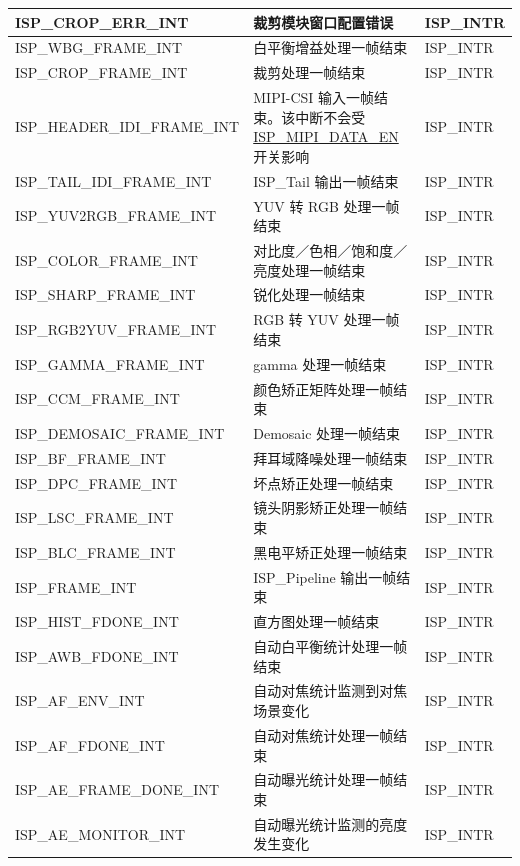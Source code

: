 \documentclass[main\_\_CN.tex]{subfiles}
\begin{document}
\begin{longtable}{ | L{5.6cm} | L{5.8cm} | L{3cm} | }
    ISP\_CROP\_ERR\_INT & 裁剪模块窗口配置错误 & ISP\_INTR \\ \hline
    ISP\_WBG\_FRAME\_INT & 白平衡增益处理一帧结束 & ISP\_INTR \\ \hline
    ISP\_CROP\_FRAME\_INT & 裁剪处理一帧结束 & ISP\_INTR \\ \hline
    ISP\_HEADER\_IDI\_FRAME\_INT & MIPI-CSI 输入一帧结束。该中断不会受 \hyperref[fielddesc:ISPMIPIDATAEN]{ISP\_MIPI\_DATA\_EN} 开关影响 & ISP\_INTR \\ \hline
    ISP\_TAIL\_IDI\_FRAME\_INT & ISP\_Tail 输出一帧结束 & ISP\_INTR \\ \hline
    ISP\_YUV2RGB\_FRAME\_INT & YUV 转 RGB 处理一帧结束 & ISP\_INTR \\ \hline
    ISP\_COLOR\_FRAME\_INT & 对比度／色相／饱和度／亮度处理一帧结束 & ISP\_INTR \\ \hline
    ISP\_SHARP\_FRAME\_INT & 锐化处理一帧结束 & ISP\_INTR \\ \hline
    ISP\_RGB2YUV\_FRAME\_INT & RGB 转 YUV 处理一帧结束 & ISP\_INTR \\ \hline
    ISP\_GAMMA\_FRAME\_INT & gamma 处理一帧结束 & ISP\_INTR \\ \hline
    ISP\_CCM\_FRAME\_INT & 颜色矫正矩阵处理一帧结束 & ISP\_INTR \\ \hline
    ISP\_DEMOSAIC\_FRAME\_INT & Demosaic 处理一帧结束 & ISP\_INTR \\ \hline
    ISP\_BF\_FRAME\_INT & 拜耳域降噪处理一帧结束 & ISP\_INTR \\ \hline
    ISP\_DPC\_FRAME\_INT & 坏点矫正处理一帧结束 & ISP\_INTR \\ \hline
    ISP\_LSC\_FRAME\_INT & 镜头阴影矫正处理一帧结束 & ISP\_INTR \\ \hline
    ISP\_BLC\_FRAME\_INT & 黑电平矫正处理一帧结束 & ISP\_INTR \\ \hline
    ISP\_FRAME\_INT & ISP\_Pipeline 输出一帧结束 & ISP\_INTR \\ \hline
    ISP\_HIST\_FDONE\_INT & 直方图处理一帧结束 & ISP\_INTR \\ \hline
    ISP\_AWB\_FDONE\_INT & 自动白平衡统计处理一帧结束 & ISP\_INTR \\ \hline
    ISP\_AF\_ENV\_INT & 自动对焦统计监测到对焦场景变化 & ISP\_INTR \\ \hline
    ISP\_AF\_FDONE\_INT & 自动对焦统计处理一帧结束 & ISP\_INTR \\ \hline
    ISP\_AE\_FRAME\_DONE\_INT & 自动曝光统计处理一帧结束 & ISP\_INTR \\ \hline
    ISP\_AE\_MONITOR\_INT & 自动曝光统计监测的亮度发生变化 & ISP\_INTR \\ \hline

\end{longtable}
\end{document}
